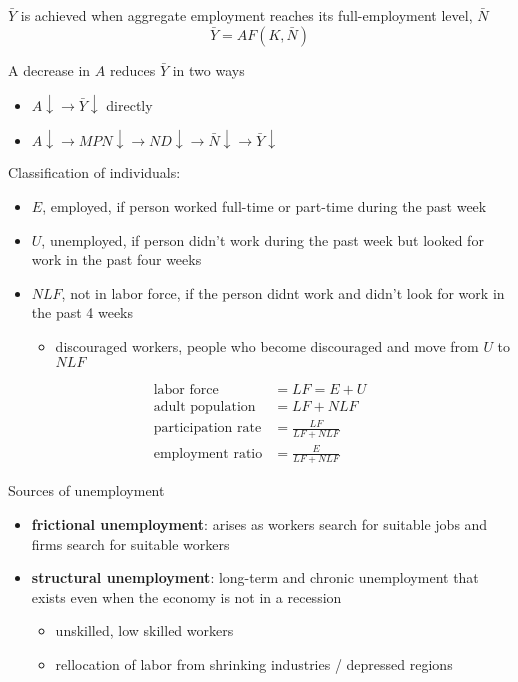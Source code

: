 \documentclass[letterpaper, 9pt,landscape]{extarticle}
\begin{document}
\begin{multicols*}{5}
\begin{definition}
    $\bar{Y} $ is achieved when aggregate employment reaches its full-employment level, $\bar{N}$
    \[
        \bar{Y}  = AF \left( K, \bar{N}  \right) 
    \]
\end{definition}
\begin{remark}
    A decrease in $A$ reduces $\bar{Y} $ in two ways
    \begin{itemize}
        \item  $A \downarrow \rightarrow \bar{Y} \downarrow$ directly 
        \item  $A \downarrow \rightarrow MPN \downarrow \rightarrow ND \downarrow \rightarrow \bar{N} \downarrow \rightarrow \bar{Y} \downarrow $ 
    \end{itemize} 
\end{remark}

\begin{remark}
    Classification of individuals:
    \begin{itemize}
        \item $E$, employed, if person worked full-time or part-time during the past week
        \item $U$, unemployed, if person didn't work during the past week but looked for work in the past four weeks
        \item $NLF$, not in labor force, if the person didnt work and didn't look for work in the past 4 weeks
        \begin{itemize}
            \item discouraged workers, people who become discouraged and move from $U$ to $NLF$
        \end{itemize} 
    \end{itemize} 
    \begin{align*}
        \text{labor force} &= LF =  E + U \\
        \text{adult population} &= LF + NLF \\
        \text{participation rate} &= \frac{LF}{LF + NLF} \\
        \text{employment ratio} &= \frac{E}{LF + NLF}
    \end{align*}
\end{remark}

\begin{remark}
    Sources of unemployment 
    \begin{itemize}
        \item \textbf{frictional unemployment}: arises as workers search for suitable jobs and firms search for suitable workers
        \item \textbf{structural unemployment}: long-term and chronic unemployment that exists even when the economy is not in a recession
        \begin{itemize}
            \item unskilled, low skilled workers
            \item rellocation of labor from shrinking industries / depressed regions
        \end{itemize} 
    \end{itemize} 
\end{remark}


\end{multicols*}
\end{document}
